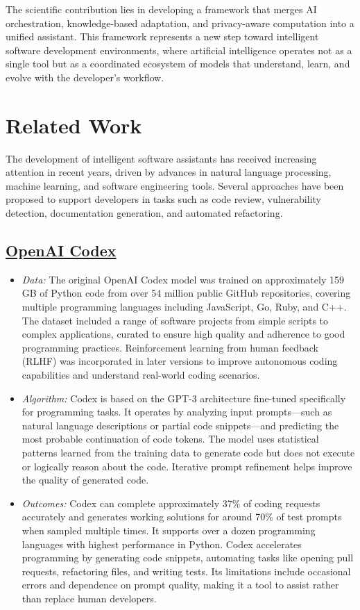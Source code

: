 \documentclass[12pt,a4paper]{article}
\begin{document}
The scientific contribution lies in developing a framework that merges AI orchestration, knowledge-based adaptation, and 
privacy-aware computation into a unified assistant. This framework represents a new step toward intelligent software 
development environments, where artificial intelligence operates not as a single tool but as a coordinated ecosystem of 
models that understand, learn, and evolve with the developer’s workflow.

\section{Related Work}

The development of intelligent software assistants has received increasing attention in recent years, driven by advances 
in natural language processing, machine learning, and software engineering tools. Several approaches have been proposed 
to support developers in tasks such as code review, vulnerability detection, documentation generation, and automated 
refactoring.

\subsection{\href{https://github.com/openai/codex}{OpenAI Codex}}

\begin{itemize}[leftmargin=1.5em]
    \item \textit{Data:} The original OpenAI Codex model was trained on approximately 159 GB of Python code from over 54 
    million public GitHub repositories, covering multiple programming languages including JavaScript, Go, Ruby, and C++. 
    The dataset included a range of software projects from simple scripts to complex applications, curated to ensure 
    high quality and adherence to good programming practices. Reinforcement learning from human feedback (RLHF) was 
    incorporated in later versions to improve autonomous coding capabilities and understand real-world coding scenarios.
    \item \textit{Algorithm:} Codex is based on the GPT-3 architecture fine-tuned specifically for programming tasks. It 
    operates by analyzing input prompts—such as natural language descriptions or partial code snippets—and predicting 
    the most probable continuation of code tokens. The model uses statistical patterns learned from the training data to 
    generate code but does not execute or logically reason about the code. Iterative prompt refinement helps improve the 
    quality of generated code.
    \item \textit{Outcomes:} Codex can complete approximately 37\% of coding requests accurately and generates working 
    solutions for around 70\% of test prompts when sampled multiple times. It supports over a dozen programming 
    languages with highest performance in Python. Codex accelerates programming by generating code snippets, automating 
    tasks like opening pull requests, refactoring files, and writing tests. Its limitations include occasional errors 
    and dependence on prompt quality, making it a tool to assist rather than replace human developers.
\end{itemize}
\end{document}
